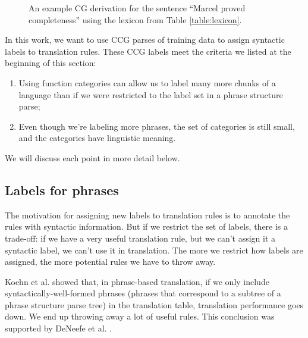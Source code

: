 \documentclass[a4paper]{article}
\begin{document}
\begin{figure}
\centering
{}
\caption{An example CG derivation for the sentence ``Marcel proved completeness'' using the lexicon from Table \ref{table:lexicon}.\label{fig:ccg-derivation}}
\end{figure}

In this work, we want to use CCG parses of training data to assign syntactic labels to translation rules. These CCG labels meet the criteria we listed at the beginning of this section:
\begin{enumerate}
\item Using function categories can allow us to label many more chunks of a language than if we were restricted to the label set in a phrase structure parse;
\item Even though we're labeling more phrases, the set of categories is still small, and the categories have linguistic meaning.
\end{enumerate}
We will discuss each point in more detail below.

\subsection{Labels for phrases}

The motivation for assigning new labels to translation rules is to annotate the rules with syntactic information. But if we restrict the set of labels, there is a trade-off: if we have a very useful translation rule, but we can't assign it a syntactic label, we can't use it in translation. The more we restrict how labels are assigned, the more potential rules we have to throw away.

Koehn et al.  showed that, in phrase-based translation, if we only include syntactically-well-formed phrases (phrases that correspond to a subtree of a phrase structure parse tree) in the translation table, translation performance goes down. We end up throwing away a lot of useful rules. This conclusion was supported by DeNeefe et al. .
\end{document}
